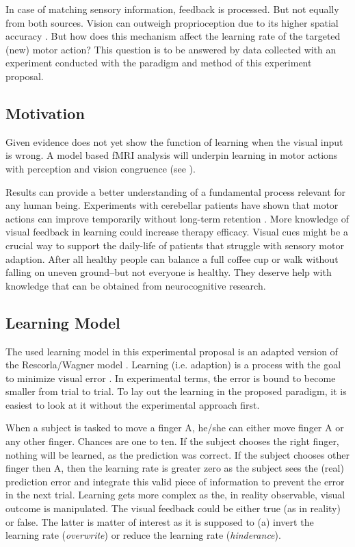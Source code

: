 \documentclass[man]{apa7}
\begin{document}
In case of matching sensory information, feedback is processed. But not equally from both sources. Vision can outweigh proprioception due to its higher spatial accuracy \parencite{Limanowski2016}. But how does this mechanism affect the learning rate of the targeted (new) motor action? This question is to be answered by data collected with an experiment conducted with the paradigm and method of this experiment proposal.

\subsection{Motivation}

Given evidence does not yet show the function of learning when the visual input is wrong. A model based fMRI analysis will underpin learning in motor actions with perception and vision congruence (see \cite{Limanowski2016}).

Results can provide a better understanding of a fundamental process relevant for any human being. Experiments with cerebellar patients have shown that motor actions can improve temporarily without long-term retention \parencite{seidler2013motor}. More knowledge of visual feedback in learning could increase therapy efficacy. Visual cues might be a crucial way to support the daily-life of patients that struggle with sensory motor adaption. After all healthy people can balance a full coffee cup or walk without falling on uneven ground–but not everyone is healthy. They deserve help with knowledge that can be obtained from neurocognitive research.


\subsection{Learning Model}

The used learning model in this experimental proposal is an adapted version of the Rescorla/Wagner model \parencite{Rescorla1972ATO}. Learning (i.e. adaption) is a process with the goal to minimize visual error \parencite{Tsay2022}. In experimental terms, the error is bound to become smaller from trial to trial. To lay out the learning in the proposed paradigm, it is easiest to look at it without the experimental approach first.

When a subject is tasked to move a finger A, he/she can either move finger A or any other finger. Chances are one to ten. If the subject chooses the right finger, nothing will be learned, as the prediction was correct. If the subject chooses other finger then A, then the learning rate is greater zero as the subject sees the (real) prediction error and integrate this valid piece of information to prevent the error in the next trial. Learning gets more complex as the, in reality observable, visual outcome is manipulated. The visual feedback could be either true (as in reality) or false. The latter is matter of interest as it is supposed to (a) invert the learning rate (\textit{overwrite}) or reduce the learning rate (\textit{hinderance}).
\end{document}
